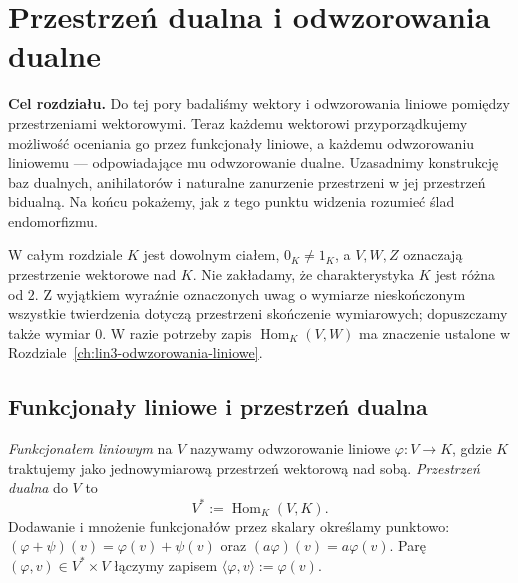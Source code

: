 \chapter{Przestrzeń dualna i odwzorowania dualne}
\label{ch:lin7-przestrzen-dualna}

\noindent\textbf{Cel rozdziału.}
Do tej pory badaliśmy wektory i odwzorowania
liniowe pomiędzy przestrzeniami wektorowymi.
Teraz każdemu wektorowi przyporządkujemy
możliwość oceniania go przez funkcjonały
liniowe, a każdemu odwzorowaniu liniowemu
--- odpowiadające mu odwzorowanie dualne.
Uzasadnimy konstrukcję baz dualnych,
anihilatorów i naturalne zanurzenie przestrzeni
w jej przestrzeń bidualną. Na końcu pokażemy,
jak z tego punktu widzenia rozumieć
ślad endomorfizmu.

W całym rozdziale \(K\) jest dowolnym ciałem,
\(0_K\ne1_K\), a \(V,W,Z\) oznaczają przestrzenie
wektorowe nad \(K\). Nie zakładamy, że
charakterystyka \(K\) jest różna od \(2\).
Z wyjątkiem wyraźnie oznaczonych uwag
o wymiarze nieskończonym wszystkie twierdzenia
dotyczą przestrzeni skończenie wymiarowych;
dopuszczamy także wymiar \(0\).
W razie potrzeby zapis \(\operatorname{Hom}_K(V,W)\)
ma znaczenie ustalone w
Rozdziale~\ref{ch:lin3-odwzorowania-liniowe}.

\section{Funkcjonały liniowe i przestrzeń dualna}
\label{sec:lin7-funkcjonaly}

\begin{definicja}
\label{def:lin7-dual}
\emph{Funkcjonałem liniowym} na \(V\)
nazywamy odwzorowanie liniowe
\(\varphi\colon V\to K\), gdzie \(K\)
traktujemy jako jednowymiarową
przestrzeń wektorową nad sobą.
\emph{Przestrzeń dualna} do \(V\) to
\[
 V^*:=\operatorname{Hom}_K(V,K).
\]
Dodawanie i mnożenie funkcjonałów
przez skalary określamy punktowo:
\((\varphi+\psi)(v)=\varphi(v)+\psi(v)\)
oraz \((a\varphi)(v)=a\varphi(v)\).
Parę \((\varphi,v)\in V^*\times V\)
łączymy zapisem
\(\langle\varphi,v\rangle:=\varphi(v)\).
\end{definicja}

